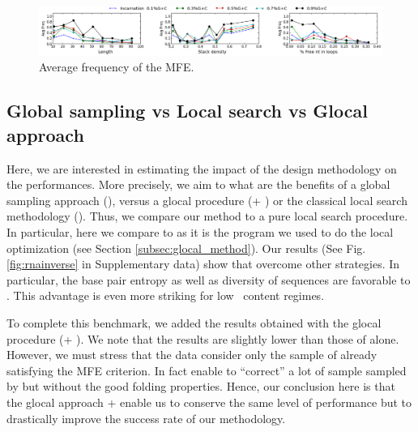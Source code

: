 \begin{figure}[ht!]
	\centering
	\includegraphics[width=\textwidth]{Figures/freq.png}
	\caption{Average frequency of the MFE.}
	\label{fig:freq}
\end{figure}

\subsection{Global sampling vs Local search vs Glocal approach}
Here, we are interested in estimating the impact of the design methodology on the performances. More precisely, we aim to what are the benefits of a global sampling approach (\ourprog), versus a glocal procedure (\ourprog + \RNAinverse) or the classical local search methodology (\RNAinverse). Thus, we compare our method to a pure local search procedure. In particular, here we compare to \RNAinverse as it is the program we used to do the local optimization (see Section \ref{subsec:glocal_method}). Our results (See Fig. \ref{fig:rnainverse} in Supplementary data) show that \ourprog overcome other strategies. In particular, the base pair entropy as well as diversity of sequences are favorable to \ourprog. This advantage is even more striking for low \gc~content regimes.

To complete this benchmark, we added the results obtained with the glocal procedure (\ourprog + \RNAinverse). We note that the results are slightly lower than those of \ourprog alone. However, we must stress that the \ourprog data consider only the sample of \ourprog already satisfying the MFE criterion. In fact \RNAinverse enable to ``correct'' a lot of sample sampled by \ourprog but without the good folding properties. Hence, our conclusion here is that the glocal approach \ourprog + \RNAinverse enable us to conserve the same level of performance but to drastically improve the success rate of our methodology. 






\label{fig:rnainverse}

